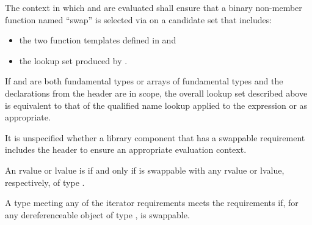 \pnum
The context in which  and  are evaluated shall
ensure that a binary non-member function named ``swap'' is selected via  on a candidate set that includes:
\begin{itemize}
\item the two  function templates defined in
 and

\item the lookup set produced by .
\end{itemize}
\begin{note}
If  and  are both fundamental types or arrays of
fundamental types and the declarations from the header  are in
scope, the overall lookup set described above is equivalent to that of the
qualified name lookup applied to the expression  or
 as appropriate.
\end{note}
\begin{note}
It is unspecified whether a library component that has a swappable
requirement includes the header  to ensure an appropriate
evaluation context.
\end{note}

\pnum
An rvalue or lvalue  is  if and only if  is
swappable with any rvalue or lvalue, respectively, of type .

\pnum
A type  meeting any of the iterator requirements
meets the  requirements if,
for any dereferenceable object
 of type ,
 is swappable.

